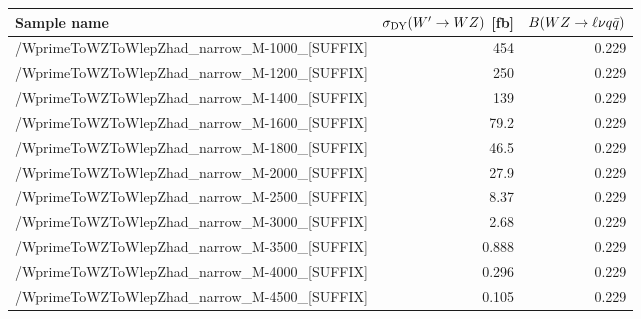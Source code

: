 \footnotesize
\begin{tabular}{lrr}
  \hline
  \textbf{Sample name} & $\sigma_{\mathrm{DY}}(W'\to WZ)$ [fb] & $B(WZ\to\ell\nu q\bar{q})$ \\
  \hline
  \ttfamily/WprimeToWZToWlepZhad\_narrow\_M-1000\_[SUFFIX] & 454 & 0.229  \\
  \ttfamily/WprimeToWZToWlepZhad\_narrow\_M-1200\_[SUFFIX] & 250 & 0.229  \\
  \ttfamily/WprimeToWZToWlepZhad\_narrow\_M-1400\_[SUFFIX] & 139 & 0.229  \\
  \ttfamily/WprimeToWZToWlepZhad\_narrow\_M-1600\_[SUFFIX] & 79.2 & 0.229  \\
  \ttfamily/WprimeToWZToWlepZhad\_narrow\_M-1800\_[SUFFIX] & 46.5 & 0.229  \\
  \ttfamily/WprimeToWZToWlepZhad\_narrow\_M-2000\_[SUFFIX] & 27.9 & 0.229  \\
  \ttfamily/WprimeToWZToWlepZhad\_narrow\_M-2500\_[SUFFIX] & 8.37 & 0.229  \\
  \ttfamily/WprimeToWZToWlepZhad\_narrow\_M-3000\_[SUFFIX] & 2.68 & 0.229  \\
  \ttfamily/WprimeToWZToWlepZhad\_narrow\_M-3500\_[SUFFIX] & 0.888 & 0.229  \\
  \ttfamily/WprimeToWZToWlepZhad\_narrow\_M-4000\_[SUFFIX] & 0.296 & 0.229  \\
  \ttfamily/WprimeToWZToWlepZhad\_narrow\_M-4500\_[SUFFIX] & 0.105 & 0.229  \\
  \hline
\end{tabular}
